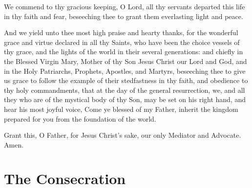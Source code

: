 


We commend to thy gracious keeping, O Lord, all thy servants departed this life in thy faith and fear, beseeching thee to grant them everlasting light and peace. %

And we yield unto thee most high praise and hearty thanks, for the wonderful grace and virtue declared in all thy Saints, who have been the choice vessels of thy grace, and the lights of the world in their several generations: 
and chiefly in the Blessed Virgin Mary, Mother of thy Son Jesus Christ our Lord and God, and in the Holy Patriarchs, Prophets, Apostles, and Martyrs,
beseeching thee to give us grace to follow the example of their stedfastness in thy faith, and obedience to thy holy commandments, that at the day of the general resurrection, we, and all they who are of the mystical body of thy Son, may be set on his right hand, and hear his most joyful voice, Come ye blessed of my Father, inherit the kingdom prepared for you from the foundation of the world.


Grant this, O Father, for Jesus Christ's sake, our only Mediator and Advocate. \R Amen.

\section{The Consecration}



